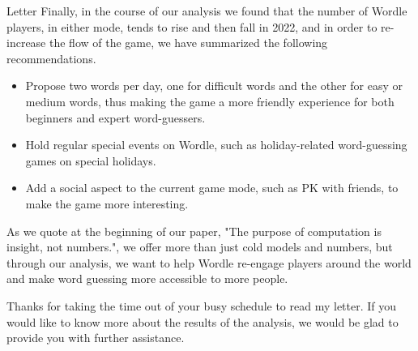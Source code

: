 \documentclass[12pt]{article}  %
\begin{document}
\begin{letter}{Letter}
    Finally, in the course of our analysis we found that the number of Wordle players, in either mode, tends to rise and then fall in 2022, and in order to re-increase the flow of the game, we have summarized the following recommendations.
    \begin{itemize}
        \item Propose two words per day, one for difficult words and the other for easy or medium words, thus making the game a more friendly experience for both beginners and expert word-guessers.
        \item Hold regular special events on Wordle, such as holiday-related word-guessing games on special holidays.
        \item Add a social aspect to the current game mode, such as PK with friends, to make the game more interesting.
     \end{itemize}
    
    As we quote at the beginning of our paper, "The purpose of computation is insight, not numbers.", we offer more than just cold models and numbers, but through our analysis, we want to help Wordle re-engage players around the world and make word guessing more accessible to more people.
    
    Thanks for taking the time out of your busy schedule to read my letter. If you would like to know more about the results of the analysis, we would be glad to provide you with further assistance.
    \end{letter}
    
\end{document}
